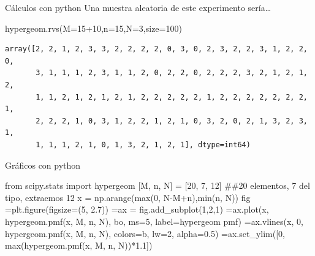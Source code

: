 \documentclass[
  ignorenonframetext,
  aspectratio=169]{beamer}
\newenvironment{Shaded}{\begin{snugshade}}{\end{snugshade}}
\newcommand{\BuiltInTok}[1]{\textcolor[rgb]{0.00,0.23,0.31}{#1}}
\newcommand{\CommentTok}[1]{\textcolor[rgb]{0.37,0.37,0.37}{#1}}
\newcommand{\DecValTok}[1]{\textcolor[rgb]{0.68,0.00,0.00}{#1}}
\newcommand{\FloatTok}[1]{\textcolor[rgb]{0.68,0.00,0.00}{#1}}
\newcommand{\ImportTok}[1]{\textcolor[rgb]{0.00,0.46,0.62}{#1}}
\newcommand{\NormalTok}[1]{\textcolor[rgb]{0.00,0.23,0.31}{#1}}
\newcommand{\OperatorTok}[1]{\textcolor[rgb]{0.37,0.37,0.37}{#1}}
\newcommand{\StringTok}[1]{\textcolor[rgb]{0.13,0.47,0.30}{#1}}
\begin{document}
\begin{frame}[fragile]{Cálculos con python}
\protect\hypertarget{cuxe1lculos-con-python-12}{}
Una muestra aleatoria de este experimento sería\ldots{}

\begin{Shaded}
\begin{Highlighting}[]
\NormalTok{hypergeom.rvs(M}\OperatorTok{=}\DecValTok{15}\OperatorTok{+}\DecValTok{10}\NormalTok{,n}\OperatorTok{=}\DecValTok{15}\NormalTok{,N}\OperatorTok{=}\DecValTok{3}\NormalTok{,size}\OperatorTok{=}\DecValTok{100}\NormalTok{)}
\end{Highlighting}
\end{Shaded}

\begin{verbatim}
array([2, 2, 1, 2, 3, 3, 2, 2, 2, 2, 0, 3, 0, 2, 3, 2, 2, 3, 1, 2, 2, 0,
       3, 1, 1, 1, 2, 3, 1, 1, 2, 0, 2, 2, 0, 2, 2, 2, 3, 2, 1, 2, 1, 2,
       1, 1, 2, 1, 2, 1, 2, 1, 2, 2, 2, 2, 2, 1, 2, 2, 2, 2, 2, 2, 2, 1,
       2, 2, 2, 1, 0, 3, 1, 2, 2, 1, 2, 1, 0, 3, 2, 0, 2, 1, 3, 2, 3, 1,
       1, 1, 1, 2, 1, 0, 1, 3, 2, 1, 2, 1], dtype=int64)
\end{verbatim}
\end{frame}

\begin{frame}[fragile]{Gráficos con python}
\protect\hypertarget{gruxe1ficos-con-python-5}{}
\begin{Shaded}
\begin{Highlighting}[]
\ImportTok{from}\NormalTok{ scipy.stats }\ImportTok{import}\NormalTok{ hypergeom}
\NormalTok{[M, n, N] }\OperatorTok{=}\NormalTok{ [}\DecValTok{20}\NormalTok{, }\DecValTok{7}\NormalTok{, }\DecValTok{12}\NormalTok{] }\CommentTok{\#\#20 elementos, 7 del tipo, extraemos 12}
\NormalTok{x }\OperatorTok{=}\NormalTok{ np.arange(}\BuiltInTok{max}\NormalTok{(}\DecValTok{0}\NormalTok{, N}\OperatorTok{{-}}\NormalTok{M}\OperatorTok{+}\NormalTok{n),}\BuiltInTok{min}\NormalTok{(n, N))}
\NormalTok{fig }\OperatorTok{=}\NormalTok{plt.figure(figsize}\OperatorTok{=}\NormalTok{(}\DecValTok{5}\NormalTok{, }\FloatTok{2.7}\NormalTok{))}
 \OperatorTok{=}\NormalTok{ax }\OperatorTok{=}\NormalTok{ fig.add\_subplot(}\DecValTok{1}\NormalTok{,}\DecValTok{2}\NormalTok{,}\DecValTok{1}\NormalTok{)}
 \OperatorTok{=}\NormalTok{ax.plot(x, hypergeom.pmf(x, M, n, N), }\StringTok{\textquotesingle{}bo\textquotesingle{}}\NormalTok{, ms}\OperatorTok{=}\DecValTok{5}\NormalTok{, label}\OperatorTok{=}\StringTok{\textquotesingle{}hypergeom pmf\textquotesingle{}}\NormalTok{)}
 \OperatorTok{=}\NormalTok{ax.vlines(x, }\DecValTok{0}\NormalTok{, hypergeom.pmf(x, M, n, N), colors}\OperatorTok{=}\StringTok{\textquotesingle{}b\textquotesingle{}}\NormalTok{, lw}\OperatorTok{=}\DecValTok{2}\NormalTok{, alpha}\OperatorTok{=}\FloatTok{0.5}\NormalTok{)}
 \OperatorTok{=}\NormalTok{ax.set\_ylim([}\DecValTok{0}\NormalTok{, }\BuiltInTok{max}\NormalTok{(hypergeom.pmf(x, M, n, N))}\OperatorTok{*}\FloatTok{1.1}\NormalTok{])}
\end{Highlighting}
\end{Shaded}
\end{frame}
\end{document}

